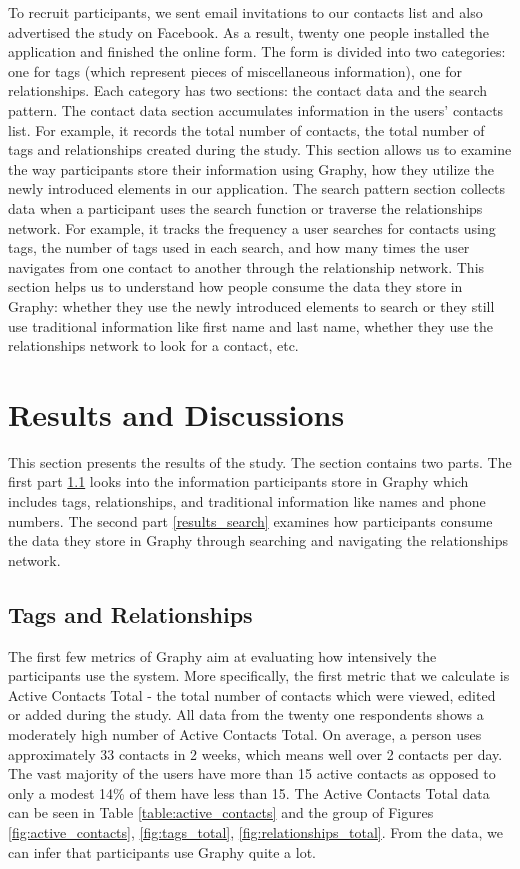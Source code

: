 To recruit participants, we sent email invitations to our contacts list and also advertised the study on Facebook. As a result, twenty one people installed the application and finished the online form. The form is divided into two categories: one for tags (which represent pieces of miscellaneous information), one for relationships. Each category has two sections: the contact data and the search pattern. The contact data section accumulates information in the users' contacts list. For example, it records the total number of contacts, the total number of tags and relationships created during the study. This section allows us to examine the way participants store their information using Graphy, how they utilize the newly introduced elements in our application. The search pattern section collects data when a participant uses the search function or traverse the relationships network. For example, it tracks the frequency a user searches for contacts using tags, the number of tags used in each search, and how many times the user navigates from one contact to another through the relationship network. This section helps us to understand how people consume the data they store in Graphy: whether they use the newly introduced elements to search or they still use traditional information like first name and last name, whether they use the relationships network to look for a contact, etc.
\section{Results and Discussions}
This section presents the results of the study. The section contains two parts. The first part \textit{} \ref{results_tags_relationships} looks into the information participants store in Graphy which includes tags, relationships, and traditional information like names and phone numbers. The second part \textit{} \ref{results_search} examines how participants consume the data they store in Graphy through searching and navigating the relationships network.
\subsection{Tags and Relationships}\label{results_tags_relationships}
The first few metrics of Graphy aim at evaluating how intensively the participants use the system. More specifically, the first metric that we calculate is Active Contacts Total - the total number of contacts which were viewed, edited or added during the study. All data from the twenty one respondents shows a moderately high number of Active Contacts Total. On average, a person uses approximately 33 contacts in 2 weeks, which means well over 2 contacts per day. The vast majority of the users have more than 15 active contacts as opposed to only a modest 14\% of them have less than 15. The Active Contacts Total data can be seen in Table \ref{table:active_contacts} and the group of Figures \ref{fig:active_contacts}, \ref{fig:tags_total}, \ref{fig:relationships_total}. From the data, we can infer that participants use Graphy quite a lot. 

